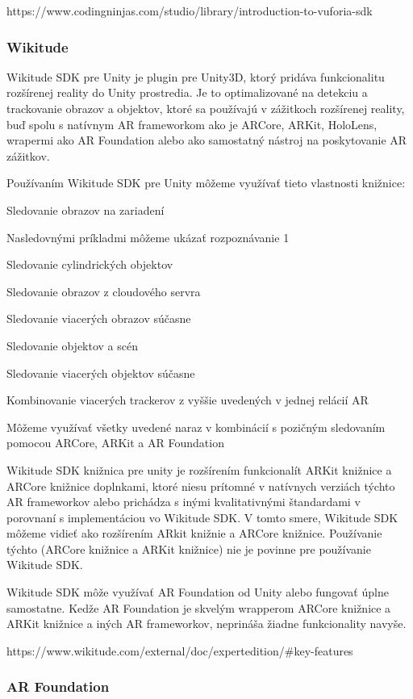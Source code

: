 https://www.codingninjas.com/studio/library/introduction-to-vuforia-sdk

\subsubsection{Wikitude}

Wikitude SDK pre Unity je plugin pre Unity3D, ktorý pridáva funkcionalitu rozšírenej reality do Unity prostredia. Je to optimalizované na detekciu a trackovanie obrazov a objektov, ktoré sa používajú v zážitkoch rozšírenej reality, buď spolu s natívnym AR frameworkom ako je ARCore, ARKit, HoloLens, wrapermi ako AR Foundation alebo ako samostatný nástroj na poskytovanie AR zážitkov.

Používaním Wikitude SDK pre Unity môžeme využívať tieto vlastnosti knižnice:

Sledovanie obrazov na zariadení

Nasledovnými príkladmi môžeme ukázať rozpoznávanie 1

Sledovanie cylindrických objektov

Sledovanie obrazov z cloudového servra

Sledovanie viacerých obrazov súčasne

Sledovanie objektov a scén

Sledovanie viacerých objektov súčasne

Kombinovanie viacerých trackerov z vyššie uvedených v jednej relácií AR

Môžeme využívať všetky uvedené naraz v kombinácií s pozičným sledovaním pomocou ARCore, ARKit a AR Foundation

Wikitude SDK knižnica pre unity je rozšírením funkcionalít ARKit knižnice a ARCore knižnice doplnkami, ktoré niesu prítomné v natívnych verziách týchto AR frameworkov alebo prichádza s inými kvalitativnými štandardami v porovnaní s implementáciou vo Wikitude SDK. V tomto smere, Wikitude SDK môžeme vidieť ako rozšírením ARkit knižnie a ARCore knižnice. Používanie týchto (ARCore knižnice a ARKit knižnice) nie je povinne pre používanie Wikitude SDK.

Wikitude SDK môže využívať AR Foundation od Unity alebo fungovať úplne samostatne. Kedže AR Foundation je skvelým wrapperom ARCore knižnice a ARKit knižnice a iných AR frameworkov, neprináša žiadne funkcionality navyše.

https://www.wikitude.com/external/doc/expertedition/\#key-features

\subsubsection{AR Foundation} 

